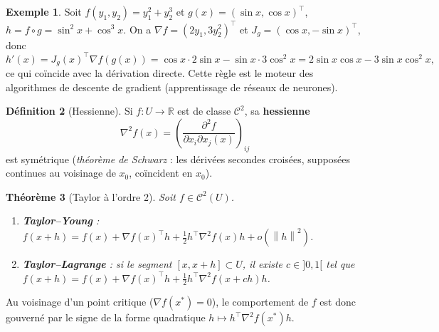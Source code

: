 \documentclass[a4paper,11pt]{report}
\theoremstyle{plain}
\newtheorem{theorem}{Théorème}[]
\theoremstyle{definition}
\newtheorem{definition}[theorem]{Définition}
\newtheorem{exemple}[theorem]{Exemple}
\theoremstyle{remark}
\newcommand{\R}{\mathbb{R}}
\newcommand{\norm}[1]{\left\lVert#1\right\rVert}
\newcommand{\grad}{\nabla}
\newcommand{\hess}{\nabla^2}
\newcommand{\T}{^{\!\top}}
\begin{document}
			\begin{exemple}
				Soit $f(y_1,y_2)=y_1^2+y_2^3$ et $g(x)=(\sin x,\cos x)\T$, $h=f\circ g=\sin^2x+\cos^3x$. On a $\grad f=(2y_1,3y_2^2)\T$ et $J_g=(\cos x,-\sin x)\T$, donc
				\[h'(x)=J_g(x)\T\grad f(g(x))=\cos x\cdot2\sin x-\sin x\cdot3\cos^2x=2\sin x\cos x-3\sin x\cos^2x,\]
				ce qui coïncide avec la dérivation directe. Cette règle est le moteur des algorithmes de descente de gradient (apprentissage de réseaux de neurones).
			\end{exemple}
			\begin{definition}[Hessienne]
				Si $f:U\to\R$ est de classe $\mathcal C^2$, sa \textbf{hessienne} $$\hess f(x)=\left( \dfrac{\partial^2f}{\partial x_i\partial x_j(x)}\right) _{ij}$$ est symétrique (\emph{théorème de Schwarz} : les dérivées secondes croisées, supposées continues au voisinage de $x_0$, coïncident en $x_0$).
			\end{definition}
			\begin{theorem}[Taylor à l'ordre 2]
				Soit $f\in\mathcal C^2(U)$. 
				\begin{enumerate}
					\item \textbf{Taylor--Young} : $f(x+h)=f(x)+\grad f(x)\T h+\tfrac12h\T\hess f(x)h+o(\norm h^2)$. 
					\item \textbf{Taylor--Lagrange} : si le segment $[x,x+h]\subset U$, il existe $c\in]0,1[$ tel que $f(x+h)=f(x)+\grad f(x)\T h+\tfrac12h\T\hess f(x+ch)h$.
				\end{enumerate}
			\end{theorem}
			Au voisinage d'un point critique ($\grad f(x^*)=0$), le comportement de $f$ est donc gouverné par le signe de la forme quadratique $h\mapsto h\T\hess f(x^*)h$.
			
\end{document}

